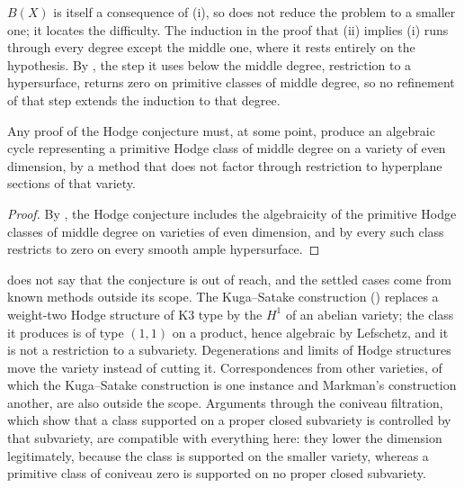 \begin{remark}\label{rem:notsimpler}
$B(X)$ is itself a consequence of (i), so
 does not reduce the problem to a smaller one; it
locates the difficulty. The induction in the proof that (ii) implies (i) runs
through every degree except the middle one, where it rests entirely on the
hypothesis. By , the step it uses below the middle
degree, restriction to a hypersurface, returns zero on primitive classes of
middle degree, so no refinement of that step extends the induction to that
degree.
\end{remark}

\begin{corollary}\label{cor:whereidea}
Any proof of the Hodge conjecture must, at some point, produce an algebraic
cycle representing a primitive Hodge class of middle degree on a variety of
even dimension, by a method that does not factor through restriction to
hyperplane sections of that variety.
\end{corollary}

\begin{proof}
By , the Hodge conjecture includes the algebraicity of
the primitive Hodge classes of middle degree on varieties of even dimension,
and by  every such class restricts to zero on every smooth
ample hypersurface.
\end{proof}

\begin{remark}%
\label{rem:othermethods}
 does not say that the conjecture is out of reach, and
the settled cases come from known methods outside its scope. The
Kuga--Satake construction () replaces a weight-two Hodge
structure of K3 type by the $H^{1}$ of an abelian variety; the class it
produces is of type $(1,1)$ on a product, hence algebraic by Lefschetz, and it
is not a restriction to a subvariety. Degenerations and limits of Hodge
structures move the variety instead of cutting it. Correspondences from other
varieties, of which the Kuga--Satake construction is one instance and
Markman's construction \cite{Mar25a,Mar25b} another, are also outside the
scope. Arguments through the coniveau filtration, which show that a class
supported on a proper closed subvariety is controlled by that subvariety, are
compatible with everything here: they lower the dimension legitimately,
because the class is supported on the smaller variety, whereas a primitive
class of coniveau zero is supported on no proper closed subvariety.
\end{remark}

